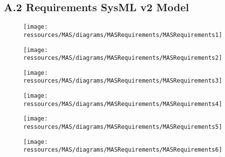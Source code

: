 \subsection*{A.2 Requirements SysML v2 Model}\label{app:req-mod} %
\begin{figure}[H]
  \centering
  \texttt{[image: ressources/MAS/diagrams/MASRequirements/MASRequirements1]}
\end{figure}
\begin{figure}[H]
  \centering
  \texttt{[image: ressources/MAS/diagrams/MASRequirements/MASRequirements2]}
\end{figure}
\begin{figure}[H]
  \centering
  \texttt{[image: ressources/MAS/diagrams/MASRequirements/MASRequirements3]}
\end{figure}
\begin{figure}[H]
  \centering
  \texttt{[image: ressources/MAS/diagrams/MASRequirements/MASRequirements4]}
\end{figure}
\begin{figure}[H]
  \centering
  \texttt{[image: ressources/MAS/diagrams/MASRequirements/MASRequirements5]}
\end{figure}
\begin{figure}[H]
  \centering
  \texttt{[image: ressources/MAS/diagrams/MASRequirements/MASRequirements6]}
\end{figure}
\clearpage



% 


